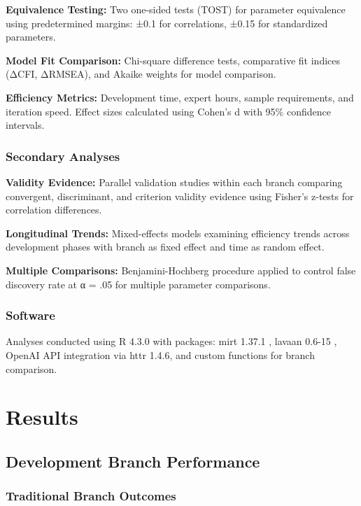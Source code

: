 \documentclass[12pt,a4paper]{article}
\begin{document}
\textbf{Equivalence Testing:} Two one-sided tests (TOST) for parameter equivalence using predetermined margins: ±0.1 for correlations, ±0.15 for standardized parameters.

\textbf{Model Fit Comparison:} Chi-square difference tests, comparative fit indices (ΔCFI, ΔRMSEA), and Akaike weights for model comparison.

\textbf{Efficiency Metrics:} Development time, expert hours, sample requirements, and iteration speed. Effect sizes calculated using Cohen's d with 95\% confidence intervals.

\subsubsection{Secondary Analyses}

\textbf{Validity Evidence:} Parallel validation studies within each branch comparing convergent, discriminant, and criterion validity evidence using Fisher's z-tests for correlation differences.

\textbf{Longitudinal Trends:} Mixed-effects models examining efficiency trends across development phases with branch as fixed effect and time as random effect.

\textbf{Multiple Comparisons:} Benjamini-Hochberg procedure applied to control false discovery rate at α = .05 for multiple parameter comparisons.

\subsubsection{Software}

Analyses conducted using R 4.3.0 with packages: mirt 1.37.1 \cite{Chalmers2012}, lavaan 0.6-15 \cite{Rosseel2012}, OpenAI API integration via httr 1.4.6, and custom functions for branch comparison.

\section{Results}

\subsection{Development Branch Performance}

\subsubsection{Traditional Branch Outcomes}
\end{document}
